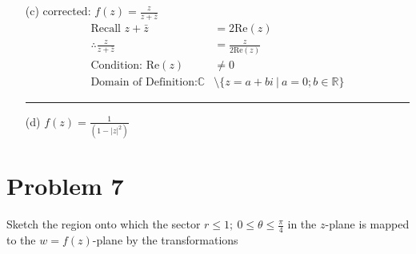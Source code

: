 \documentclass{article}
\begin{document}
\begin{enumerate}
\item[(c)] corrected: $f(z) = \frac{z}{z + \bar{z}}$
\begin{align*}
  \text{Recall } z+\bar z &= 2\text{Re}(z) \\
  \therefore \frac{z}{z + \bar{z}} &= \frac{z}{2\text{Re}(z)} \\
  \text{Condition: Re}(z) &\neq 0 \\
  \text{Domain of Definition:} \mathbb{C} &\setminus \{z = a+bi\ |\ a = 0;b\in \mathbb{R}\}
\end{align*}
 \vspace{1cm}
 \hrule
  \item[(d)] $f(z) = \frac{1}{(1-|z|^2)}$
\end{enumerate}
\newpage
\section{Problem 7}
 Sketch the region onto which the sector $r \le 1;\ 0 \le \theta \le \frac{\pi}{4}$ in the $z$-plane is mapped to
 the $w = f(z)$-plane by the transformations
\end{document}
